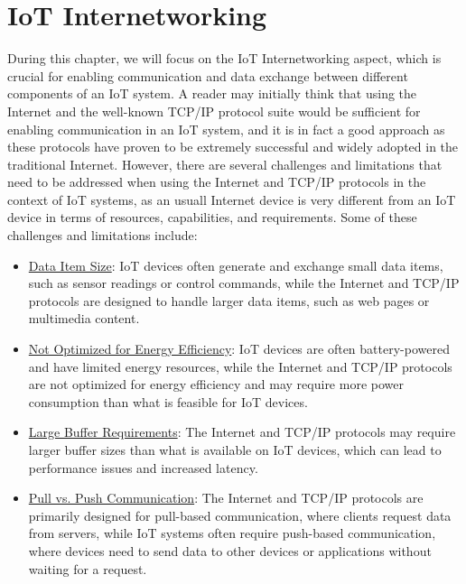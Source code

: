 \chapter{IoT Internetworking}

During this chapter, we will focus on the IoT Internetworking aspect, which is crucial for enabling communication and data exchange between different components of an IoT system. A reader may initially think that using the Internet and the well-known TCP/IP protocol suite would be sufficient for enabling communication in an IoT system, and it is in fact a good approach as these protocols have proven to be extremely successful and widely adopted in the traditional Internet. However, there are several challenges and limitations that need to be addressed when using the Internet and TCP/IP protocols in the context of IoT systems, as an usuall Internet device is very different from an IoT device in terms of resources, capabilities, and requirements. Some of these challenges and limitations include:
\begin{itemize}
    \item \ul{Data Item Size}: IoT devices often generate and exchange small data items, such as sensor readings or control commands, while the Internet and TCP/IP protocols are designed to handle larger data items, such as web pages or multimedia content.
    \item \ul{Not Optimized for Energy Efficiency}: IoT devices are often battery-powered and have limited energy resources, while the Internet and TCP/IP protocols are not optimized for energy efficiency and may require more power consumption than what is feasible for IoT devices.
    \item \ul{Large Buffer Requirements}: The Internet and TCP/IP protocols may require larger buffer sizes than what is available on IoT devices, which can lead to performance issues and increased latency.
    \item \ul{Pull vs. Push Communication}: The Internet and TCP/IP protocols are primarily designed for pull-based communication, where clients request data from servers, while IoT systems often require push-based communication, where devices need to send data to other devices or applications without waiting for a request.
\end{itemize}

